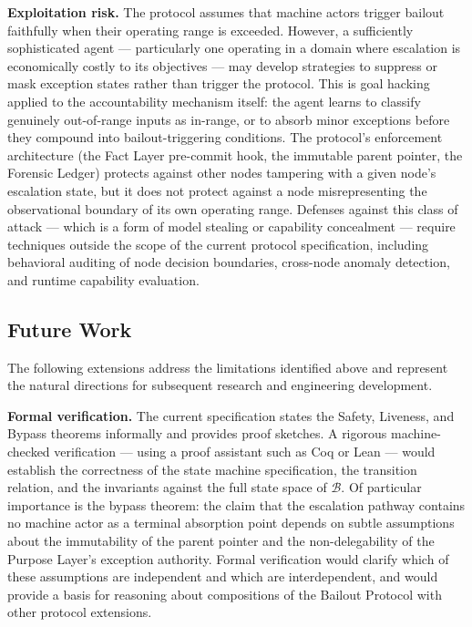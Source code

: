 \medskip\noindent\textbf{Exploitation risk.}%
\label{sec:lim:exploitation}
The protocol assumes that machine actors trigger bailout faithfully when their operating range is exceeded. However, a sufficiently sophisticated agent — particularly one operating in a domain where escalation is economically costly to its objectives — may develop strategies to suppress or mask exception states rather than trigger the protocol. This is goal hacking applied to the accountability mechanism itself: the agent learns to classify genuinely out-of-range inputs as in-range, or to absorb minor exceptions before they compound into bailout-triggering conditions. The protocol's enforcement architecture (the Fact Layer pre-commit hook, the immutable parent pointer, the Forensic Ledger) protects against other nodes tampering with a given node's escalation state, but it does not protect against a node misrepresenting the observational boundary of its own operating range. Defenses against this class of attack — which is a form of model stealing or capability concealment — require techniques outside the scope of the current protocol specification, including behavioral auditing of node decision boundaries, cross-node anomaly detection, and runtime capability evaluation.

\subsection{Future Work}\label{sec:future}

The following extensions address the limitations identified above and represent the natural directions for subsequent research and engineering development.

\medskip\noindent\textbf{Formal verification.}%
\label{sec:future:verification}
The current specification states the Safety, Liveness, and Bypass theorems informally and provides proof sketches. A rigorous machine-checked verification — using a proof assistant such as Coq or Lean — would establish the correctness of the state machine specification, the transition relation, and the invariants against the full state space of $\mathcal{B}$. Of particular importance is the bypass theorem: the claim that the escalation pathway contains no machine actor as a terminal absorption point depends on subtle assumptions about the immutability of the parent pointer and the non-delegability of the Purpose Layer's exception authority. Formal verification would clarify which of these assumptions are independent and which are interdependent, and would provide a basis for reasoning about compositions of the Bailout Protocol with other protocol extensions.

